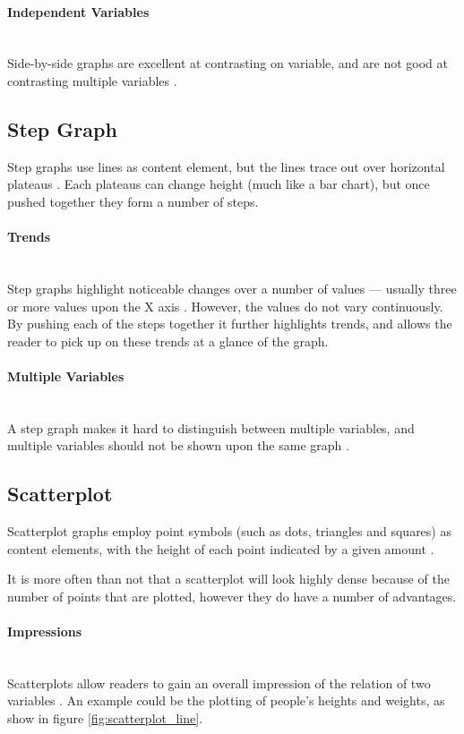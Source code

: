 \paragraph{Independent Variables} ~\\
Side-by-side graphs are excellent at contrasting on variable, and are not good 
at contrasting multiple variables \citep{kosslyn06}. 


\subsection{Step Graph}
Step graphs use lines as content element, but the lines trace out over 
horizontal plateaus \citep{kosslyn06}. Each plateaus can change height (much 
like a bar chart), but once pushed together they form a number of steps.

\paragraph{Trends} ~\\
Step graphs highlight noticeable changes over a number of values --- usually 
three or more values upon the X axis \citep{kosslyn06}. However, the values do
not vary continuously. By pushing each of the steps together it further 
highlights trends, and allows the reader to pick up on these trends at a glance
of the graph.

\paragraph{Multiple Variables} ~\\
A step graph makes it hard to distinguish between multiple variables, and 
multiple variables should not be shown upon the same graph \citep{kosslyn06}.


\subsection{Scatterplot}
Scatterplot graphs employ point symbols (such as dots, triangles and squares) 
as content elements, with the height of each point indicated by a given amount
\citep{kosslyn06}. 

It is more often than not that a scatterplot will look highly dense because of 
the number of points that are plotted, however they do have a number of 
advantages.

\paragraph{Impressions} ~\\
Scatterplots allow readers to gain an overall impression of the relation of two
variables \citep{kosslyn06}. An example could be the plotting of people's 
heights and weights, as show in figure \ref{fig:scatterplot_line}.

